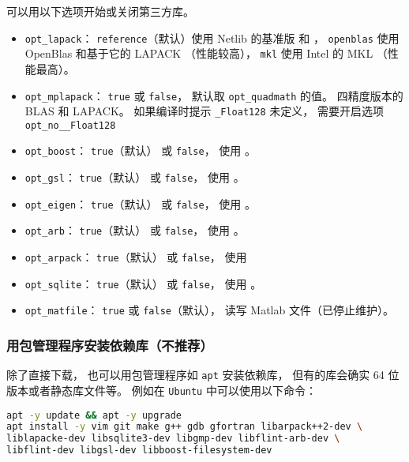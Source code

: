 可以用以下选项开始或关闭第三方库。
\begin{itemize}
\item \verb`opt_lapack`： \verb`reference`（默认）使用 Netlib 的基准版  和 ， \verb`openblas` 使用 OpenBlas 和基于它的 LAPACK （性能较高）， \verb`mkl` 使用 Intel 的 MKL （性能最高）。
\item \verb`opt_mplapack`： \verb`true` 或 \verb`false`， 默认取 \verb`opt_quadmath` 的值。 四精度版本的 BLAS 和 LAPACK。 如果编译时提示 \verb`_Float128` 未定义， 需要开启选项 \verb`opt_no__Float128`
\item \verb`opt_boost`： \verb`true`（默认） 或 \verb`false`， 使用 。
\item \verb`opt_gsl`： \verb`true`（默认） 或 \verb`false`， 使用 。
\item \verb`opt_eigen`： \verb`true`（默认） 或 \verb`false`， 使用 。
\item \verb`opt_arb`： \verb`true`（默认） 或 \verb`false`， 使用 。
\item \verb`opt_arpack`： \verb`true`（默认） 或 \verb`false`， 使用 
\item \verb`opt_sqlite`： \verb`true`（默认） 或 \verb`false`， 使用 。
\item \verb`opt_matfile`： \verb`true` 或 \verb`false`（默认）， 读写 Matlab 文件（已停止维护）。
\end{itemize}

\subsubsection{用包管理程序安装依赖库（不推荐）}
除了直接下载， 也可以用包管理程序如 \verb`apt` 安装依赖库， 但有的库会确实 64 位版本或者静态库文件等。 例如在 \verb`Ubuntu` 中可以使用以下命令： 
\begin{lstlisting}[language=bash]
apt -y update && apt -y upgrade
apt install -y vim git make g++ gdb gfortran libarpack++2-dev \
liblapacke-dev libsqlite3-dev libgmp-dev libflint-arb-dev \
libflint-dev libgsl-dev libboost-filesystem-dev
\end{lstlisting}
